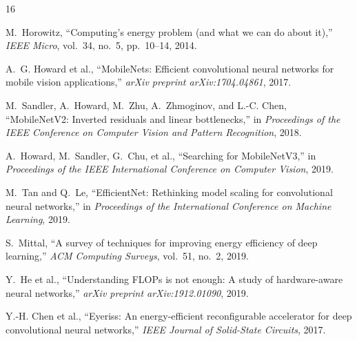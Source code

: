 \documentclass[11pt]{article}
\begin{document}
\begin{thebibliography}{16}

M.~Horowitz, ``Computing's energy problem (and what we can do about it),''
\emph{IEEE Micro}, vol.~34, no.~5, pp.~10--14, 2014.

A.~G. Howard et al., ``MobileNets: Efficient convolutional neural networks for
mobile vision applications,'' \emph{arXiv preprint arXiv:1704.04861}, 2017.

M.~Sandler, A.~Howard, M.~Zhu, A.~Zhmoginov, and L.-C. Chen,
``MobileNetV2: Inverted residuals and linear bottlenecks,'' in
\emph{Proceedings of the IEEE Conference on Computer Vision and Pattern Recognition}, 2018.

A.~Howard, M.~Sandler, G.~Chu, et al., ``Searching for MobileNetV3,'' in
\emph{Proceedings of the IEEE International Conference on Computer Vision}, 2019.

M.~Tan and Q.~Le, ``EfficientNet: Rethinking model scaling for convolutional
neural networks,'' in \emph{Proceedings of the International Conference on
Machine Learning}, 2019.

S.~Mittal, ``A survey of techniques for improving energy efficiency of deep
learning,'' \emph{ACM Computing Surveys}, vol.~51, no.~2, 2019.

Y.~He et al., ``Understanding FLOPs is not enough: A study of hardware-aware
neural networks,'' \emph{arXiv preprint arXiv:1912.01090}, 2019.

Y.-H. Chen et al., ``Eyeriss: An energy-efficient reconfigurable accelerator
for deep convolutional neural networks,'' \emph{IEEE Journal of Solid-State
Circuits}, 2017.

\end{thebibliography}
\end{document}
